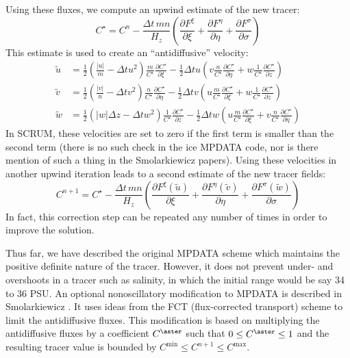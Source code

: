 Using these fluxes, we compute an upwind estimate of the new
tracer:
\begin{equation}
   C^{\star} = C^n - \frac{\Delta t\, mn}{H_z} \left(
   \frac{\partial F^\xi}{\partial \xi} +
   \frac{\partial F^\eta}{\partial \eta} +
   \frac{\partial F^\sigma}{\partial \sigma} \right)
\end{equation}
This estimate is used to create an ``antidiffusive'' velocity:
\begin{align}
   \tilde{u} &= \frac{1}{2}
      \left( \frac{|u|}{m} - \Delta t u^2 \right)
      \frac{m}{C^\star} \frac{\partial C^\star}{\partial \xi} -
      \frac{1}{2} \Delta t u \left( v \frac{n}{C^\star} 
      \frac{\partial C^\star}{\partial \eta} +
      w \frac{1}{C^\star} \frac{\partial C^\star}{\partial z}
      \right) \label{antiu} \\
   \tilde{v} &= \frac{1}{2}
      \left( \frac{|v|}{n} - \Delta t v^2 \right)
      \frac{n}{C^\star} \frac{\partial C^\star}{\partial \eta} -
      \frac{1}{2} \Delta t v \left( u \frac{m}{C^\star} 
      \frac{\partial C^\star}{\partial \xi} +
      w \frac{1}{C^\star} \frac{\partial C^\star}{\partial z}
      \right) \label{antiv} \\
   \tilde{w} &= \frac{1}{2}
      \left( |w| \Delta z - \Delta t w^2 \right)
      \frac{1}{C^\star} \frac{\partial C^\star}{\partial z} -
      \frac{1}{2} \Delta t w \left( u \frac{m}{C^\star} 
      \frac{\partial C^\star}{\partial \xi} +
      v \frac{n}{C^\star} \frac{\partial C^\star}{\partial \eta}
      \right) \label{antiw}
\end{align}
In SCRUM, these velocities are set to zero if the first term is smaller
than the second term (there is no such check in the ice MPDATA code,
nor is there mention of such a thing in the Smolarkiewicz papers).
Using these velocities in another upwind iteration leads to a second
estimate of the new tracer fields:
\begin{equation}
   C^{n+1} = C^\star - \frac{\Delta t\, mn}{H_z} \left(
   \frac{\partial F^\xi(\tilde{u})}{\partial \xi} +
   \frac{\partial F^\eta(\tilde{v})}{\partial \eta} +
   \frac{\partial F^\sigma(\tilde{w})}{\partial \sigma} \right)
\label{antidiff}
\end{equation}
In fact, this correction step can be repeated any number of times in
order to improve the solution.

Thus far, we have described the original MPDATA scheme which
maintains the positive definite nature of the tracer.  However, it does
not prevent under- and overshoots in a tracer such as salinity, in which
the initial range would be say 34 to 36 PSU. An optional nonoscillatory
modification to MPDATA is described in Smolarkiewicz \cite{Smolark90}.
It uses ideas from the FCT (flux-corrected transport) scheme to limit
the antidiffusive fluxes. This modification is based on multiplying the
antidiffusive fluxes by a coefficient $C^\aster$ such that $0 \leq
C^\aster \leq 1$
and the resulting tracer value is bounded by $C^{\min} \leq
C^{n+1} \leq C^{\max}$.
  
